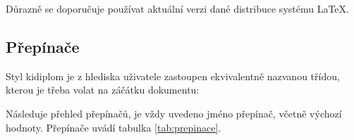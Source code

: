 \documentclass[
  biblatex,
  glossaries,
  index
]{kidiplom}
\begin{document}
Důrazně se doporučuje používat aktuální verzi dané distribuce systému \LaTeX{}.


\subsection{Přepínače}
Styl kidiplom je z hlediska uživatele zastoupen ekvivalentně nazvanou třídou, kterou je třeba volat na záčátku dokumentu:

Následuje přehled přepínačů, je vždy uvedeno jméno přepínač, včetně výchozí hodnoty. Přepínače uvádí tabulka \ref{tab:prepinace}.
\end{document}
